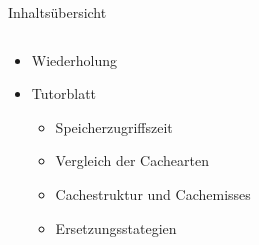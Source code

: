 \documentclass[
  german,            %
  aspectratio=169,    %
]{tumbeamer}
\begin{document}
\begin{frame}[c]{Inhaltsübersicht}{}
  \begin{columns}[c]
    \begin{column}{1\textwidth}
      \begin{itemize}
        \item Wiederholung
        \item Tutorblatt
        \begin{itemize}
          \item Speicherzugriffszeit
          \item Vergleich der Cachearten
          \item Cachestruktur und Cachemisses
          \item Ersetzungsstategien
        \end{itemize}
      \end{itemize}
    \end{column}
  \end{columns}
\end{frame}
\end{document}
